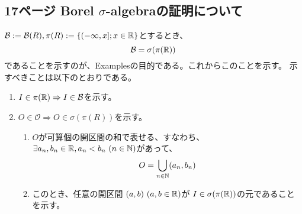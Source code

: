     \subsection{17ページ Borel $\sigma$-algebraの証明について}
        ${\mathcal{B}} := {\mathcal{B}}(R), \pi(R) :=\{(-\infty, x];x\in{\mathbb{R}}\}$とするとき、
        \[
            {\mathcal{B}} = \sigma(\pi({\mathbb{R}}))
        \]
        であることを示すのが、Examplesの目的である。これからこのことを示す。
        示すべきことは以下のとおりである。
        \begin{enumerate}[font = \bfseries, label = step \arabic*.]
            \item $I\in\pi({\mathbb{R}})\Rightarrow I\in {\mathcal{B}}$を示す。
            \item $O\in\mathcal{O} \Rightarrow O \in \sigma(\pi(R))$を示す。
            \begin{enumerate}
                \item $O$が可算個の開区間の和で表せる、すなわち、
                    $\exists a_n, b_n\in\RR, a_n < b_n\ (n\in\NN)$があって、
                    \[
                        O = \bigcup_{n\in {\mathbb{N}}}(a_n, b_n)
                    \]
                \item このとき、任意の開区間
                    $(a, b)\ (a, b\in {\mathbb{R}})$が
                    $I\in\sigma(\pi({\mathbb{R}}))$の元であることを示す。
            \end{enumerate}
        \end{enumerate}
